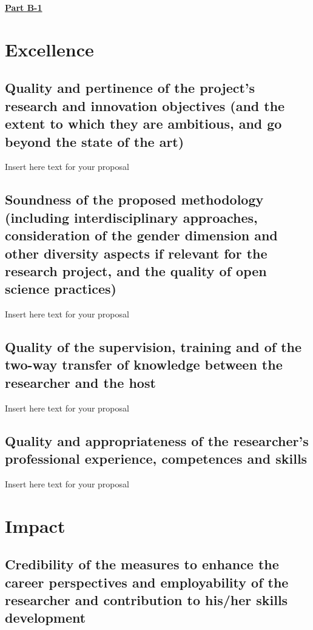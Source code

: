 \documentclass[11pt]{article}
\begin{document}
\begin{center}
	\fontsize{14}{16.8} \bfseries \underline{Part B-1}
\end{center}

\section{Excellence}

\subsection{Quality and pertinence of the project’s research and innovation objectives (and the extent to which they are ambitious, and go beyond the state of the art)}

Insert here text for your proposal

\subsection{Soundness of the proposed methodology (including interdisciplinary approaches, consideration of the gender dimension and other diversity aspects if relevant for the research project, and the quality of open science practices)}

Insert here text for your proposal

\subsection{Quality of the supervision, training and of the two-way transfer of knowledge between the researcher and the host}

Insert here text for your proposal

\subsection{Quality and appropriateness of the researcher’s professional experience, competences and skills}

Insert here text for your proposal

\section{Impact}

\subsection{Credibility of the measures to enhance the career perspectives and employability of the researcher and contribution to his/her skills development}
\end{document}
